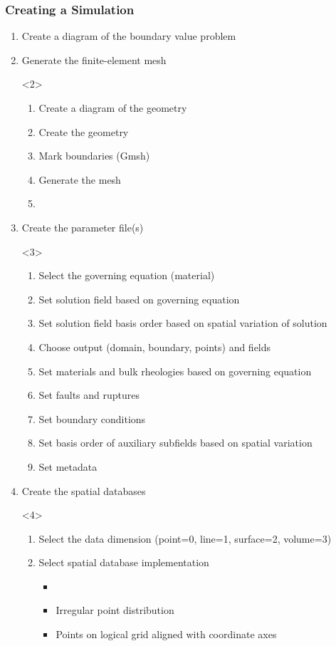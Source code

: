 \documentclass[aspectratio=169]{beamer}
\begin{document}
\begin{frame}[t]
  \frametitle{Creating a Simulation}
  \summary{}

  \begin{enumerate}
  \item Create a diagram of the boundary value problem
  \item Generate the finite-element mesh
    \begin{onlyenv}<2>
      \begin{enumerate}
      \item Create a diagram of the geometry
      \item Create the geometry
      \item Mark boundaries (Gmsh)
      \item Generate the mesh
      \item {}
      \end{enumerate}
    \end{onlyenv}
  \item Create the parameter file(s)
    \begin{onlyenv}<3>
      \begin{enumerate}
      \item Select the governing equation (material)
      \item Set solution field based on governing equation
      \item Set solution field basis order based on spatial variation of solution
      \item Choose output (domain, boundary, points) and fields
      \item Set materials and bulk rheologies based on governing equation
      \item Set faults and ruptures
      \item Set boundary conditions
      \item Set basis order of auxiliary subfields based on spatial variation
      \item Set metadata
      \end{enumerate}
    \end{onlyenv}
  \item Create the spatial databases
    \begin{onlyenv}<4>
      \begin{enumerate}
      \item Select the data dimension (point=0, line=1, surface=2, volume=3)
      \item Select spatial database implementation
        \begin{itemize}
        \item {}
        \item {} Irregular point distribution
        \item {} Points on logical grid aligned with coordinate axes
        \end{itemize}
      \end{enumerate}
    \end{onlyenv}
  \end{enumerate}
  

\end{frame}
\end{document}
